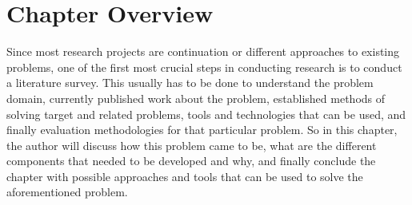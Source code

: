 \section{Chapter Overview}

Since most research projects are continuation or different approaches to existing problems, one of the first most crucial steps in conducting research is to conduct a literature survey. This usually has to be done to understand the problem domain, currently published work about the problem, established methods of solving target and related problems, tools and technologies that can be used, and finally evaluation methodologies for that particular problem. So in this chapter, the author will discuss how this problem came to be, what are the different components that needed to be developed and why, and finally conclude the chapter with possible approaches and tools that can be used to solve the aforementioned problem. 

